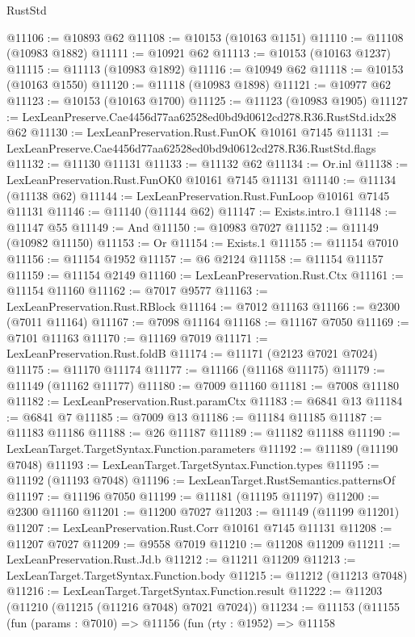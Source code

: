 \begin{lexlean}{RustStd}
\begin{coremodule}
@11106 := @10893 @62
@11108 := @10153 (@10163 @1151)
@11110 := @11108 (@10983 @1882)
@11111 := @10921 @62
@11113 := @10153 (@10163 @1237)
@11115 := @11113 (@10983 @1892)
@11116 := @10949 @62
@11118 := @10153 (@10163 @1550)
@11120 := @11118 (@10983 @1898)
@11121 := @10977 @62
@11123 := @10153 (@10163 @1700)
@11125 := @11123 (@10983 @1905)
@11127 := LexLeanPreserve.Cae4456d77aa62528ed0bd9d0612cd278.R36.RustStd.idx28 @62
@11130 := LexLeanPreservation.Rust.FunOK @10161 @7145
@11131 := LexLeanPreserve.Cae4456d77aa62528ed0bd9d0612cd278.R36.RustStd.flags
@11132 := @11130 @11131
@11133 := @11132 @62
@11134 := Or.inl
@11138 := LexLeanPreservation.Rust.FunOK0 @10161 @7145 @11131
@11140 := @11134 (@11138 @62)
@11144 := LexLeanPreservation.Rust.FunLoop @10161 @7145 @11131
@11146 := @11140 (@11144 @62)
@11147 := Exists.intro.{1}
@11148 := @11147 @55
@11149 := And
@11150 := @10983 @7027
@11152 := @11149 (@10982 @11150)
@11153 := Or
@11154 := Exists.{1}
@11155 := @11154 @7010
@11156 := @11154 @1952
@11157 := @6 @2124
@11158 := @11154 @11157
@11159 := @11154 @2149
@11160 := LexLeanPreservation.Rust.Ctx
@11161 := @11154 @11160
@11162 := @7017 @9577
@11163 := LexLeanPreservation.Rust.RBlock
@11164 := @7012 @11163
@11166 := @2300 (@7011 @11164)
@11167 := @7098 @11164
@11168 := @11167 @7050
@11169 := @7101 @11163
@11170 := @11169 @7019
@11171 := LexLeanPreservation.Rust.foldB
@11174 := @11171 (@2123 @7021 @7024)
@11175 := @11170 @11174
@11177 := @11166 (@11168 @11175)
@11179 := @11149 (@11162 @11177)
@11180 := @7009 @11160
@11181 := @7008 @11180
@11182 := LexLeanPreservation.Rust.paramCtx
@11183 := @6841 @13
@11184 := @6841 @7
@11185 := @7009 @13
@11186 := @11184 @11185
@11187 := @11183 @11186
@11188 := @26 @11187
@11189 := @11182 @11188
@11190 := LexLeanTarget.TargetSyntax.Function.parameters
@11192 := @11189 (@11190 @7048)
@11193 := LexLeanTarget.TargetSyntax.Function.types
@11195 := @11192 (@11193 @7048)
@11196 := LexLeanTarget.RustSemantics.patternsOf
@11197 := @11196 @7050
@11199 := @11181 (@11195 @11197)
@11200 := @2300 @11160
@11201 := @11200 @7027
@11203 := @11149 (@11199 @11201)
@11207 := LexLeanPreservation.Rust.Corr @10161 @7145 @11131
@11208 := @11207 @7027
@11209 := @9558 @7019
@11210 := @11208 @11209
@11211 := LexLeanPreservation.Rust.Jd.b
@11212 := @11211 @11209
@11213 := LexLeanTarget.TargetSyntax.Function.body
@11215 := @11212 (@11213 @7048)
@11216 := LexLeanTarget.TargetSyntax.Function.result
@11222 := @11203 (@11210 (@11215 (@11216 @7048) @7021 @7024))
@11234 := @11153
    (@11155
      (fun (params : @7010) =>
      @11156
        (fun (rty : @1952) =>
        @11158

\end{coremodule}
\end{lexlean}
